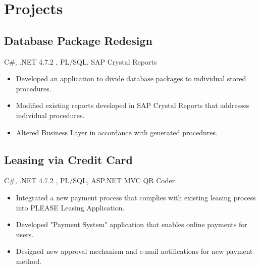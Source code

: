 \documentclass[1pt,a4paper,verdana]{moderncv} %
\begin{document}

\section{Projects}
\subsection{Database Package Redesign}
 {C\#, .NET 4.7.2 , PL/SQL, SAP Crystal Reports }
 {\begin{itemize}
		\item Developed an application to divide database packages to individual stored procedures.
		\item Modified existing reports developed in SAP Crystal Reports that addresses individual procedures.
		\item Altered Business Layer in accordance with generated procedures.
\end{itemize}}


\subsection{Leasing via Credit Card}
 {C\#, .NET 4.7.2 , PL/SQL, ASP.NET MVC}
 {QR Coder}
 {\begin{itemize}
		\item Integrated a new payment process that complies with existing leasing process into PLEASE Leasing Application.
		\item Developed  "Payment System" application that enables online payments for users.
		\item Designed new approval mechanism and e-mail notifications for new payment method.
\end{itemize}}
\end{document}
